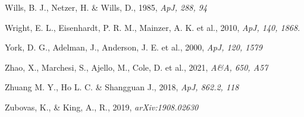 \documentclass[]{aa}
\begin{document}
\begin{thebibliography}{}
Wills, B. J., Netzer, H. \& Wills, D., 1985,
\newblock \emph{ApJ, 288, 94}

Wright, E. L.,  Eisenhardt, P. R. M., Mainzer, A. K. et al., 2010, 
\newblock \emph{ApJ, 140, 1868}.

York, D. G., Adelman, J., Anderson, J. E. et al., 2000, 
\newblock \emph{ApJ, 120, 1579}

Zhao, X., Marchesi, S., Ajello, M., Cole, D. et al., 2021,
\newblock \emph{A\&A, 650, A57}

Zhuang M. Y., Ho L. C. \& Shangguan J., 2018,
\newblock \emph{ApJ, 862.2, 118}

Zubovas, K., \& King, A., R., 2019,
\newblock \emph{arXiv:1908.02630}

\end{thebibliography}

\begingroup
\let\clearpage\relax

\label{lastpage}
\endgroup
\end{document}
